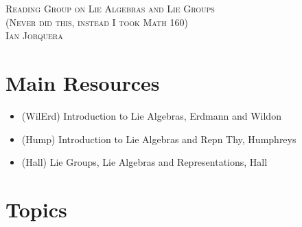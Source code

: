 \documentclass[12pt]{amsart}
\begin{document}
\begin{center}
    \textsc{Reading Group on Lie Algebras and Lie Groups\\(Never did this, instead I took Math 160)\\ Ian Jorquera}
\end{center}
\vspace{1em}

\section*{Main Resources}
\begin{itemize}
    \item[] (WilErd) Introduction to Lie Algebras, Erdmann and Wildon
    \item[] (Hump) Introduction to Lie Algebras and Repn Thy, Humphreys
    \item[] (Hall) Lie Groups, Lie Algebras and Representations, Hall 
\end{itemize}

\section*{Topics}
\end{document}

